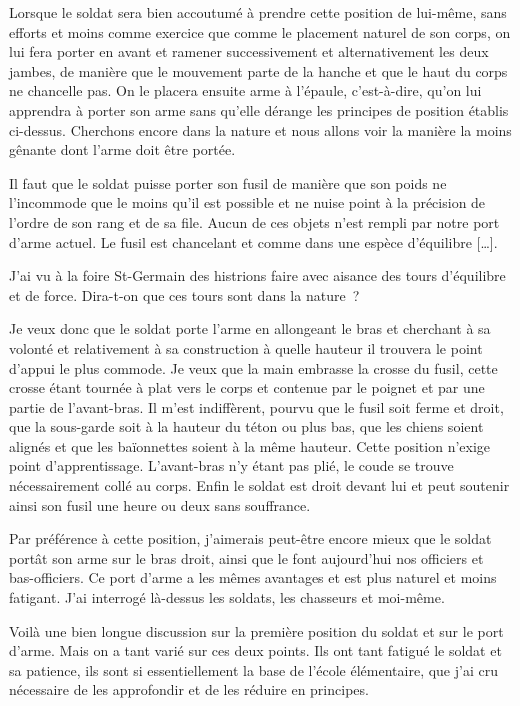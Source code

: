 \documentclass[french,twoside]{book} %
\begin{document}
Lorsque le soldat sera bien accoutumé à prendre cette position de lui-même, sans efforts et moins comme exercice que comme le placement naturel de son corps, on lui fera porter en avant et ramener successivement et alternativement les deux jambes, de manière que le mouvement parte de la hanche et que le haut du corps ne chancelle pas. On le placera ensuite arme à l’épaule, c’est-à-dire, qu’on lui apprendra à porter son arme sans qu’elle dérange les principes de position établis ci-dessus. Cherchons encore dans la nature et nous allons voir la manière la moins gênante dont l’arme doit être portée.\par
Il faut que le soldat puisse porter son fusil de manière que son poids ne l’incommode que le moins qu’il est possible et ne nuise point à la précision de l’ordre de son rang et de sa file. Aucun de ces objets n’est rempli par notre port d’arme actuel. Le fusil est chancelant et comme dans une espèce d’équilibre […].\par
J’ai vu à la foire St-Germain des histrions faire avec aisance des tours d’équilibre et de force. Dira-t-on que ces tours sont dans la nature ?\par
Je veux donc que le soldat porte l’arme en allongeant le bras et cherchant à sa volonté et relativement à sa construction à quelle hauteur il trouvera le point d’appui le plus commode. Je veux que la main embrasse la crosse du fusil, cette crosse étant tournée à plat vers le corps et contenue par le poignet et par une partie de l’avant-bras. Il m’est indiffèrent, pourvu que le fusil soit ferme et droit, que la sous-garde soit à la hauteur du téton ou plus bas, que les chiens soient alignés et que les baïonnettes soient à la même hauteur. Cette position n’exige point d’apprentissage. L’avant-bras n’y étant pas plié, le coude se trouve nécessairement collé au corps. Enfin le soldat est droit devant lui et peut soutenir ainsi son fusil une heure ou deux sans souffrance.\par
Par préférence à cette position, j’aimerais peut-être encore mieux que le soldat portât son arme sur le bras droit, ainsi que le font aujourd’hui nos officiers et bas-officiers. Ce port d’arme a les mêmes avantages et est plus naturel et moins fatigant. J’ai interrogé là-dessus les soldats, les chasseurs et moi-même.\par
Voilà une bien longue discussion sur la première position du soldat et sur le port d’arme. Mais on a tant varié sur ces deux points. Ils ont tant fatigué le soldat et sa patience, ils sont si essentiellement la base de l’école élémentaire, que j’ai cru nécessaire de les approfondir et de les réduire en principes.\par
\end{document}
